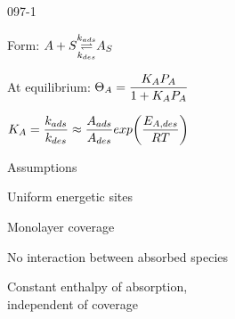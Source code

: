 \begin{mitframe}{097-1}
\begin{listone}
        \item Form: $\helmholtz+\entropy{\underset{\thermcond_{des}}{\stackrel{\thermcond_{ads}}\rightleftharpoons}}\helmholtz_{\entropy}$
  \item  At equilibrium: $\dimltemp_{\helmholtz}=\dfrac{\dilfac_{\helmholtz}\p_{\helmholtz}}{1+\dilfac_{\helmholtz}\p_{\helmholtz}}$
  	\begin{listtwo}
    	\item $\dilfac_{\helmholtz}=\dfrac{\thermcond_{ads}}{\thermcond_{des}}\approx\dfrac{\helmholtz_{ads}}{\helmholtz_{des}}exp\bigg(\dfrac{\energy_{\helmholtz,des}}{\gasconst\Temp}\bigg)$
       \end{listtwo}
\item Assumptions
	\begin{listtwo}
	\item Uniform energetic sites
    \item Monolayer coverage
    \item No interaction between absorbed species
    \item Constant enthalpy of absorption, \\
    independent of coverage
    \end{listtwo}
\end{listone}    
\end{mitframe}